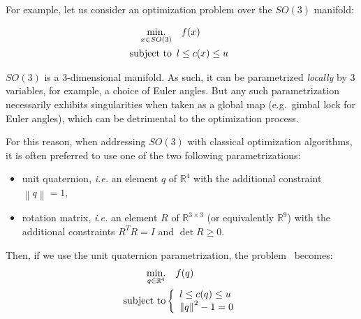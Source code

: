 For example, let us consider an optimization problem over the $SO(3)$ manifold:

\begin{align}
\label{eq:pb_on_SO3}
  \operatorname*{min.}_{x \in SO(3)} & \quad f(x)\\
  \text{subject to}&
  \begin{array}{lr}
    l \leq c(x) \leq u \nonumber
  \end{array}
\end{align}

$SO(3)$ is a 3-dimensional manifold.
As such, it can be parametrized \emph{locally} by $3$ variables, for example, a choice of Euler angles.
But any such parametrization necessarily exhibits singularities when taken as a global map (e.g.\ gimbal lock for Euler angles), which can be detrimental to the optimization process.

For this reason, when addressing $SO(3)$ with classical optimization algorithms, it is often preferred to use one of the two following parametrizations:
\begin{itemize}
    \item unit quaternion, \emph{i.e.} an element $q$ of $\mathbb{R}^4$ with the additional constraint $\left\|q\right\| = 1$,
    \item rotation matrix, \emph{i.e.} an element $R$ of $\mathbb{R}^{3 \times 3}$ (or equivalently $\mathbb{R}^9$) with the additional constraints $R^T R = I$ and $\det{R} \geq 0$.
\end{itemize}

Then, if we use the unit quaternion parametrization, the problem~ becomes:
\begin{align}
\label{eq:pb_on_SO3_quaternion}
  \operatorname*{min.}_{q \in \mathbb{R}^4} & \quad f(q)\\
  \text{subject to}&
  \left\{\begin{array}{lr}
    {l} \leq c(q) \leq {u} \nonumber\\
    {\|q\|}^2 - 1 = 0
  \end{array}\right.
\end{align}


